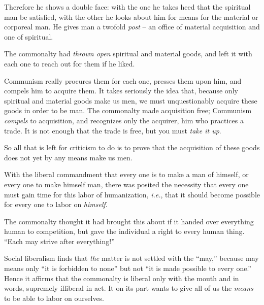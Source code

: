\documentclass[12pt,a4paper]{book}
\begin{document}
Therefore he shows a double face: with the one he takes heed that the 
spiritual man be satisfied, with the other he looks about him for means for 
the material or corporeal man. He gives man a twofold \textit{post} -- an 
office of material acquisition and one of spiritual.

The commonalty had \textit{thrown open} spiritual and material goods, and left 
it with each one to reach out for them if he liked.

Communism really procures them for each one, presses them upon him, and 
compels him to acquire them. It takes seriously the idea that, because only 
spiritual and material goods make us men, we must unquestionably acquire these 
goods in order to be man. The commonalty made acquisition free; Communism 
\textit{compels} to acquisition, and recognizes only the acquirer, him who 
practices a trade. It is not enough that the trade is free, but you must 
\textit{take it up}.

So all that is left for criticism to do is to prove that the acquisition of 
these goods does not yet by any means make us men.

With the liberal commandment that every one is to make a man of himself, or 
every one to make himself man, there was posited the necessity that every one 
must gain time for this labor of humanization, \textit{i.e.}, that it should 
become possible for every one to labor on \textit{himself}.

The commonalty thought it had brought this about if it handed over everything 
human to competition, but gave the individual a right to every human thing. 
``Each may strive after everything!''

Social liberalism finds that \textit{the} matter is not settled with the 
``may,'' because may means only ``it is forbidden to none'' but not ``it 
is made possible to every one.'' Hence it affirms that the commonalty is 
liberal only with the mouth and in words, supremely illiberal in act. It on 
its part wants to give all of us the \textit{means} to be able to labor on 
ourselves.
\end{document}

